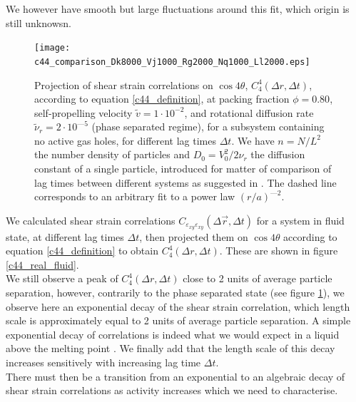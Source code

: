 \documentclass[class=report, float=false, crop=false]{standalone}
\begin{document}
We however have smooth but large fluctuations around this fit, which origin is still unknowsn.\\

\begin{figure}[H]
\centering
\texttt{[image: c44\_comparison\_Dk8000\_Vj1000\_Rg2000\_Nq1000\_Ll2000.eps]}
\caption{Projection of shear strain correlations on $\cos4\theta$, $C_4^4(\Delta r, \Delta t)$, according to equation \ref{c44_definition}, at packing fraction $\phi = 0.80$, self-propelling velocity $\tilde{v} = 1\cdot10^{-2}$, and rotational diffusion rate $\tilde{\nu}_r = 2\cdot10^{—5}$ (phase separated regime), for a subsystem containing no active gas holes, for different lag times $\Delta t$. We have $n = N/L^2$ the number density of particles and $D_0 = V_0^2/2\nu_r$ the diffusion constant of a single particle, introduced for matter of comparison of lag times between different systems as suggested in \cite{illing2016strain}. The dashed line corresponds to an arbitrary fit to a power law $(r/a)^{—2}$.}
\label{c44_real}
\end{figure}


We calculated shear strain correlations $C_{\varepsilon_{xy}\varepsilon_{xy}}(\Delta \vec{r}, \Delta t)$ for a system in fluid state, at different lag times $\Delta t$, then projected them on $\cos4\theta$ according to equation \ref{c44_definition} to obtain $C_4^4(\Delta r, \Delta t)$. These are shown in figure \ref{c44_real_fluid}.\\

We still observe a peak of $C_4^4(\Delta r, \Delta t)$ close to 2 units of average particle separation, however, contrarily to the phase separated state (see figure \ref{c44_real}), we observe here an exponential decay of the shear strain correlation, which length scale is approximately equal to 2 units of average particle separation. A simple exponential decay of correlations is indeed what we would expect in a liquid above the melting point \cite{debenedetti2001supercooled}. We finally add that the length scale of this decay increases sensitively with increasing lag time $\Delta t$.\\

There must then be a transition from an exponential to an algebraic decay of shear strain correlations as activity increases which we need to characterise.
\end{document}
